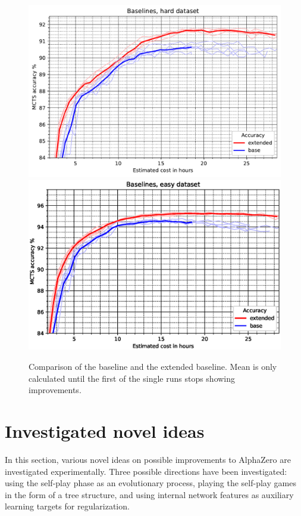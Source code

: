\documentclass[12pt,onecolumn,oneside,titlepage]{article}
\begin{document}
\begin{figure}[H]
\centering
\includegraphics[clip,width=\columnwidth]{baseline_ex}
\includegraphics[clip,width=\columnwidth]{baseline_ex_easy_dataset}
\caption{Comparison of the baseline and the extended baseline. Mean is only calculated until the first of the single runs stops showing improvements.}
\label{fig:baseline_compare}
\end{figure}

\pagebreak

\section{Investigated novel ideas}\label{s:novel_ideas}

In this section, various novel ideas on possible improvements to AlphaZero are investigated experimentally. 
Three possible directions have been investigated: using the self-play phase as an evolutionary process, playing the self-play games in the form of a tree structure, and
using internal network features as auxiliary learning targets for regularization.
\end{document}
